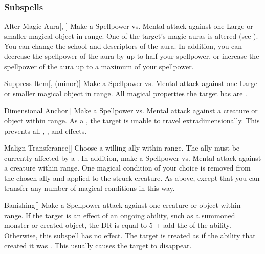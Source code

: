\subsubsection{Subspells}


\begin{ability}[\nth{1}]{Alter Magic Aura}[, ]
Make a Spellpower vs. Mental attack against one Large or smaller magical object in \rngmed range.
\hit One of the target's magic auras is altered (see ).
You can change the school and descriptors of the aura.
In addition, you can decrease the spellpower of the aura by up to half your spellpower, or increase the spellpower of the aura up to a maximum of your spellpower.
\end{ability}
\vspace{0.25em}


\begin{ability}[\nth{1}]{Suppress Item}[,  (minor)]
Make a Spellpower vs. Mental attack against one Large or smaller magical object in \rngmed range.
\hit All magical properties the target has are .
\end{ability}
\vspace{0.25em}


\begin{ability}[\nth{2}]{Dimensional Anchor}[]
Make a Spellpower vs. Mental attack against a creature or object within \rngmed range.
\hit As a , the target is unable to travel extradimensionally.
This prevents all , , and  effects.
\end{ability}
\vspace{0.25em}


\begin{ability}[\nth{2}]{Malign Transferance}[]
Choose a willing ally within \rngmed range.
The ally must be currently affected by a  .
In addition, make a Spellpower vs. Mental attack against a creature within \rngmed range.
\hit One magical condition of your choice is removed from the chosen ally and applied to the struck creature.
\crit As above, except that you can transfer any number of magical conditions in this way.
\end{ability}
\vspace{0.25em}


\begin{ability}[\nth{3}]{Banishing}[]
Make a Spellpower attack against one creature or object within \rngmed range.
If the target is an effect of an ongoing  ability, such as a summoned monster or created object, the DR is equal to 5 + add the  of the ability.
Otherwise, this subspell has no effect.
\hit The target is treated as if the ability that created it was .
This usually causes the target to disappear.
\end{ability}
\vspace{0.25em}



